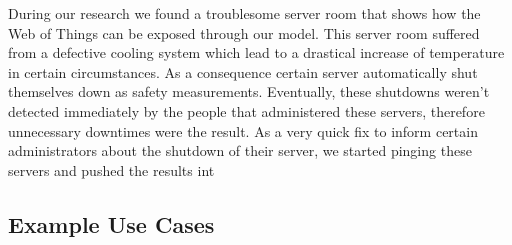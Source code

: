 















During our research we found a troublesome server room that shows how the \textrm{Web of Things} can be exposed through our model.
This server room suffered from a defective cooling system which lead to a drastical increase of temperature in certain circumstances.
As a consequence certain server automatically shut themselves down as safety measurements.
Eventually, these shutdowns weren't detected immediately by the people that administered these servers, therefore unnecessary downtimes were the result.
As a very quick fix to inform certain administrators about the shutdown of their server, we started pinging these servers and pushed the results int


\subsection{Example Use Cases}


